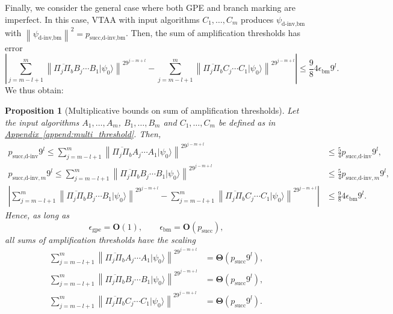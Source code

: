 \documentclass[letterpaper,onecolumn,11pt,accepted=2026-02-14]{quantumarticle}
\newcommand{\abs}[1]{\left\lvert#1\right\rvert}
\newcommand{\norm}[1]{\left\lVert#1\right\rVert}
\newtheorem{proposition}[lemma]{Proposition}
\theoremstyle{remark}
\theoremstyle{plain}
\newcommand{\append}[1]{\hyperref[append:#1]{Appendix~\ref*{append:#1}}}
\newcommand{\ket}[1]{|#1\rangle}
\begin{document}
Finally, we consider the general case where both GPE and branch marking are imperfect. In this case, VTAA with input algorithms $C_1,\ldots,C_m$ produces $\psi_{\text{d-inv,bm}}$ with $\norm{\psi_{\text{d-inv,bm}}}^2=p_{\text{succ,d-inv,bm}}$. Then, the sum of amplification thresholds has error
\begin{equation}
    \abs{\sum_{j=m-l+1}^{m}\norm{\overline{\Pi_{j}\Pi_b}B_{j}\cdots B_1\ket{\psi_0}}^29^{j-m+l}
    -\sum_{j=m-l+1}^{m}\norm{\overline{\Pi_{j}\Pi_b}C_{j}\cdots C_1\ket{\psi_0}}^29^{j-m+l}}
    \leq\frac{9}{8}4\epsilon_{\text{bm}}9^l.
\end{equation}
We thus obtain:
\begin{proposition}[Multiplicative bounds on sum of amplification thresholds]
\label{prop:multi_amp}
Let the input algorithms $A_1,\ldots,A_m$, $B_1,\ldots,B_m$ and $C_1,\ldots,C_m$ be defined as in \append{multi_threshold}. Then,
\begin{equation}
\begin{aligned}
    p_{\text{succ,d-inv}}9^l
    \leq\sum_{j=m-l+1}^{m}\norm{\overline{\Pi_{j}\Pi_b}A_{j}\cdots A_1\ket{\psi_0}}^29^{j-m+l}
    &\leq\frac{5}{4}p_{\text{succ,d-inv}}9^l,\\
    p_{\text{succ,d-inv},m}9^{l}
    \leq\sum_{j=m-l+1}^{m}\norm{\overline{\Pi_{j}\Pi_b}B_{j}\cdots B_1\ket{\psi_0}}^29^{j-m+l}
    &\leq \frac{5}{4}p_{\text{succ,d-inv},m}9^{l},\\
    \abs{\sum_{j=m-l+1}^{m}\norm{\overline{\Pi_{j}\Pi_b}B_{j}\cdots B_1\ket{\psi_0}}^29^{j-m+l}
    -\sum_{j=m-l+1}^{m}\norm{\overline{\Pi_{j}\Pi_b}C_{j}\cdots C_1\ket{\psi_0}}^29^{j-m+l}}
    &\leq\frac{9}{8}4\epsilon_{\text{bm}}9^l.
\end{aligned}
\end{equation}
Hence, as long as
\begin{equation}
    \epsilon_{\text{gpe}}=\mathbf{O}(1),\qquad
    \epsilon_{\text{bm}}=\mathbf{O}\left(p_{\text{succ}}\right),
\end{equation}
all sums of amplification thresholds have the scaling
\begin{equation}
\begin{aligned}
    \sum_{j=m-l+1}^{m}\norm{\overline{\Pi_{j}\Pi_b}A_{j}\cdots A_1\ket{\psi_0}}^29^{j-m+l}
    &=\mathbf{\Theta}\left(p_{\text{succ}}9^l\right),\\
    \sum_{j=m-l+1}^{m}\norm{\overline{\Pi_{j}\Pi_b}B_{j}\cdots B_1\ket{\psi_0}}^29^{j-m+l}
    &=\mathbf{\Theta}\left(p_{\text{succ}}9^l\right),\\
    \sum_{j=m-l+1}^{m}\norm{\overline{\Pi_{j}\Pi_b}C_{j}\cdots C_1\ket{\psi_0}}^29^{j-m+l}
    &=\mathbf{\Theta}\left(p_{\text{succ}}9^l\right).\\
\end{aligned}
\end{equation}
\end{proposition}


\clearpage


\end{document}
